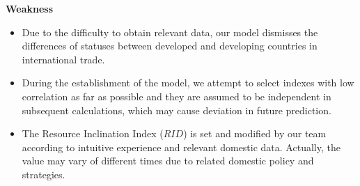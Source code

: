 \documentclass{mcmthesis}
\begin{document}
\textbf{Weakness}
\begin{itemize}
     \item Due to the difficulty to obtain relevant data, our model dismisses the differences of statuses between developed and developing countries in international trade.
     
     \item During the establishment of the model, we attempt to select indexes with low correlation as far as possible and they are assumed to be independent in subsequent calculations, which may cause deviation in future prediction.
     
     \item The Resource Inclination Index ($RID$) is set and modified by our team according to intuitive experience and relevant domestic data. Actually, the value may vary of different times due to related domestic policy and strategies.
    
\end{itemize}





\newpage


%



\newpage
\end{document}
